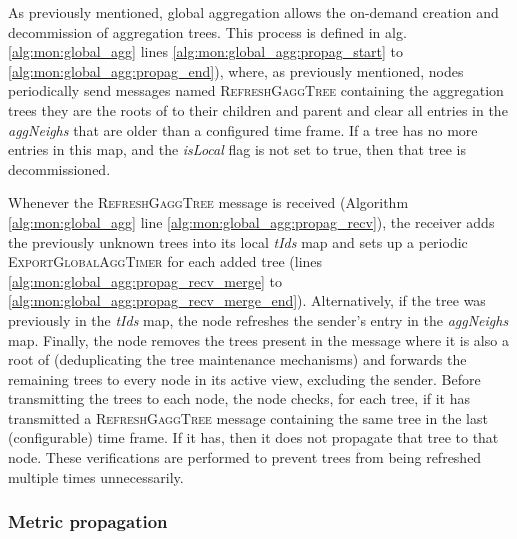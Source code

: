 As previously mentioned, global aggregation allows the on-demand creation and decommission of aggregation trees. This process is defined in alg. \ref{alg:mon:global_agg} lines \ref{alg:mon:global_agg:propag_start} to \ref{alg:mon:global_agg:propag_end}), where, as previously mentioned, nodes periodically send messages named \textsc{RefreshGaggTree} containing the aggregation trees they are the roots of to their children and parent and clear all entries in the \textit{aggNeighs} that are older than a configured time frame. If a tree has no more entries in this map, and the \textit{isLocal} flag is not set to true, then that tree is decommissioned.


Whenever the \textsc{RefreshGaggTree} message is received (Algorithm \ref{alg:mon:global_agg} line \ref{alg:mon:global_agg:propag_recv}), the receiver adds the previously unknown trees into its local \textit{tIds} map and sets up a periodic \textsc{ExportGlobalAggTimer} for each added tree (lines \ref{alg:mon:global_agg:propag_recv_merge} to \ref{alg:mon:global_agg:propag_recv_merge_end}). Alternatively, if the tree was previously in the \textit{tIds} map, the node refreshes the sender's entry in the \textit{aggNeighs} map. Finally, the node removes the trees present in the message where it is also a root of (deduplicating the tree maintenance mechanisms) and forwards the remaining trees to every node in its active view, excluding the sender. Before transmitting the trees to each node, the node checks, for each tree, if it has transmitted a \textsc{RefreshGaggTree} message containing the same tree in the last (configurable) time frame. If it has, then it does not propagate that tree to that node. These verifications are performed to prevent trees from being refreshed multiple times unnecessarily. 

\subsubsection{Metric propagation}

